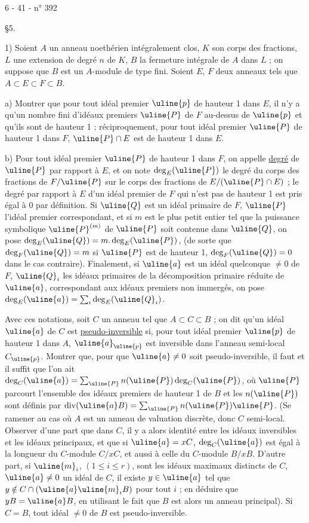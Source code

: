 \begin{center}6 - 41 - \hfill n° 392

\S 5.\end{center}
1) Soient $A$ un anneau noethérien intégralement clos, $K$ son corps des fractions, $L$ une extension de degré $n$ de $K$, $B$ la fermeture intégrale de $A$ dans $L$ ; on suppose que $B$ est un $A$-module de type fini. Soient $E$, $F$ deux anneaux tels que $A\subset E\subset F\subset B$.

a) Montrer que pour tout idéal premier $\uline{p}$ de hauteur 1 dans $E$, il n'y a qu'un nombre fini d'idéaux premiers $\uline{P}$ de $F$ au-dessus de $\uline{p}$ et qu'ils sont de hauteur 1 ; réciproquement, pour tout idéal premier $\uline{P}$ de hauteur 1 dans $F$, $\uline{P}\cap E$ est de hauteur 1 dans $E$.

b) Pour tout idéal premier $\uline{P}$ de hauteur 1 dans $F$, on appelle \uline{degré} de $\uline{P}$ par rapport à $E$, et on note $\deg_E(\uline{P})$ le degré du corps des fractions de $F/\uline{P}$ sur le corps des fractions de $E/(\uline{P}\cap E)$ ; le degré par rapport à $E$ d'un idéal premier de $F$ qui n'est pas de hauteur 1 est pris égal à 0 par définition. Si $\uline{Q}$ est un idéal primaire de $F$, $\uline{P}$ l'idéal premier correspondant, et si $m$ est le plus petit entier tel que la puissance symbolique $\uline{P}^{(m)}$ de $\uline{P}$ soit contenue dans $\uline{Q}$, on pose $\deg_E(\uline{Q})=m.\deg_E(\uline{P})$, (de sorte que $\deg_F(\uline{Q})=m$ si $\uline{P}$ est de hauteur 1, $\deg_F(\uline{Q})=0$ dans le cas contraire). Finalement, si $\uline{a}$ est un idéal quelconque $\ne0$ de $F$, $\uline{Q}_i$ les idéaux primaires de la décomposition primaire réduite de $\uline{a}$, correspondant aux idéaux premiers non immergés, on pose $\deg_E(\uline{a})=\sum_i\deg_E(\uline{Q}_i)$.

Avec ces notations, soit $C$ un anneau tel que $A\subset C\subset B$ ; on dit qu'un idéal $\uline{a}$ de $C$ est \uline{pseudo-inversible} si, pour tout idéal premier $\uline{p}$ de hauteur 1 dans $A$, $\uline{a}_{\uline{p}}$ est inversible dans l'anneau semi-local $C_{\uline{p}}$. Montrer que, pour que $\uline{a}\ne0$ soit pseudo-inversible, il faut et il suffit que l'on ait $\deg_C(\uline{a})=\sum_{\uline{P}}n(\uline{P})\deg_C(\uline{P})$, où $\uline{P}$ parcourt l'ensemble des idéaux premiers de hauteur 1 de $B$ et les $n(\uline{P})$ sont définis par $\operatorname{div}(\uline{a}B)=\sum_{\uline{P}}n(\uline{P})\uline{P}$. (Se ramener au cas où $A$ est un anneau de valuation discrète, donc $C$ semi-local. Observer d'une part que dans $C$, il y a alors identité entre les idéaux inversibles et les idéaux principaux, et que si $\uline{a}=xC$, $\deg_C(\uline{a})$ est égal à la longueur du $C$-module $C/xC$, et aussi à celle du $C$-module $B/xB$. D'autre part, si $\uline{m}_i$, $(1\le i\le r)$, sont les idéaux maximaux distincts de $C$, $\uline{a}\ne0$ un idéal de $C$, il existe $y\in\uline{a}$ tel que $y\notin C\cap(\uline{a}\uline{m}_iB)$ pour tout $i$ ; en déduire que $yB=\uline{a}B$, en utilisant le fait que $B$ est alors un anneau principal).
Si $C=B$, tout idéal $\ne0$ de $B$ est pseudo-inversible.
